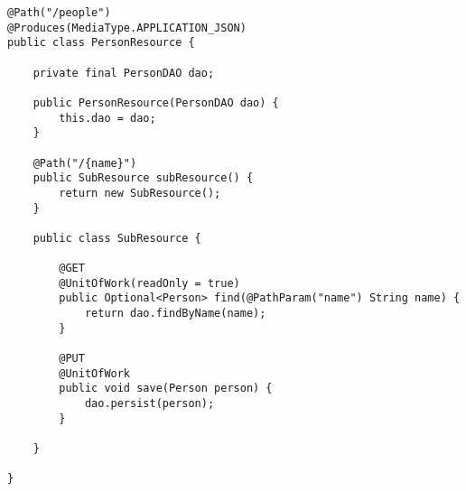 \documentclass[11pt]{article}
\begin{document}
\begin{verbatim}
@Path("/people")
@Produces(MediaType.APPLICATION_JSON)
public class PersonResource {

    private final PersonDAO dao;

    public PersonResource(PersonDAO dao) {
        this.dao = dao;
    }

    @Path("/{name}")
    public SubResource subResource() {
        return new SubResource();
    }

    public class SubResource {

        @GET
        @UnitOfWork(readOnly = true)
        public Optional<Person> find(@PathParam("name") String name) {
            return dao.findByName(name);
        }

        @PUT
        @UnitOfWork
        public void save(Person person) {
            dao.persist(person);
        }

    }

}
\end{verbatim}
\end{document}
